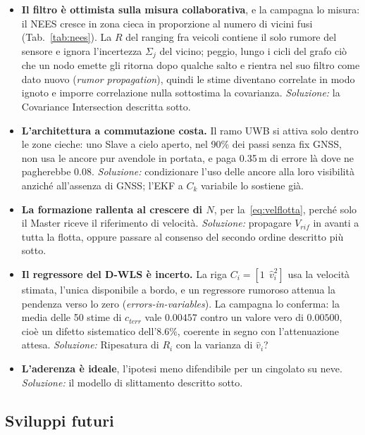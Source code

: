 \documentclass[conference,9pt]{IEEEtran}
\begin{document}
\begin{itemize}
\item \textbf{Il filtro \`e ottimista sulla misura collaborativa}, e la campagna
      lo misura: il NEES cresce in zona cieca in proporzione al numero di vicini
      fusi (Tab.~\ref{tab:nees}). La $R$ del ranging fra veicoli contiene il solo
      rumore del sensore e ignora l'incertezza $\Sigma_j$ del vicino; peggio,
      lungo i cicli del grafo ci\`o che un nodo emette gli ritorna dopo qualche
      salto e rientra nel suo filtro come dato nuovo (\emph{rumor propagation}),
      quindi le stime diventano correlate in modo ignoto e imporre correlazione
      nulla sottostima la covarianza. \emph{Soluzione:} la Covariance
      Intersection descritta sotto.
\item \textbf{L'architettura a commutazione costa.} Il ramo UWB si attiva solo
      dentro le zone cieche: uno Slave a cielo aperto, nel 90\% dei passi senza
      fix GNSS, non usa le ancore pur avendole in portata, e paga 0.35\,m di
      errore l\`a dove ne pagherebbe 0.08. \emph{Soluzione:} condizionare l'uso
      delle ancore alla loro visibilit\`a anzich\'e all'assenza di GNSS; l'EKF a
      $C_k$ variabile lo sostiene gi\`a.
\item \textbf{La formazione rallenta al crescere di $N$}, per
      la~\eqref{eq:velflotta}, perch\'e solo il Master riceve il riferimento di
      velocit\`a. \emph{Soluzione:} propagare $V_{rif}$ in avanti a tutta la
      flotta, oppure passare al consenso del secondo ordine descritto pi\`u
      sotto.
\item \textbf{Il regressore del D-WLS \`e incerto.} La riga
      $C_i = [1\ \ \hat v_i^2]$ usa la velocit\`a stimata, l'unica disponibile a
      bordo, e un regressore rumoroso attenua la pendenza verso lo zero
      (\emph{errors-in-variables}). La campagna lo conferma: la media delle 50
      stime di $c_{terr}$ vale $0.00457$ contro un valore vero di $0.00500$,
      cio\`e un difetto sistematico dell'8.6\%, coerente in segno con
      l'attenuazione attesa.
      \emph{Soluzione:} Ripesatura di $R_i$ con la varianza di $\hat v_i$? 
\item \textbf{L'aderenza \`e ideale}, l'ipotesi meno difendibile per un cingolato
      su neve. \emph{Soluzione:} il modello di slittamento descritto sotto.
\end{itemize}

\subsection{Sviluppi futuri}
\end{document}
